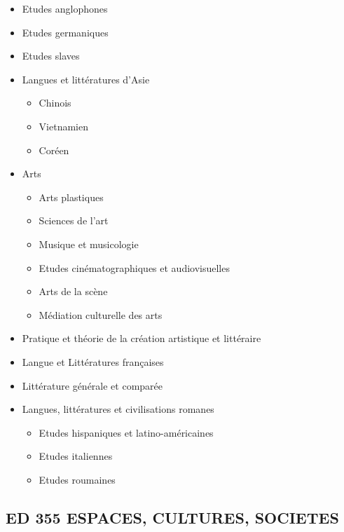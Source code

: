 		\begin{itemize}
		\item Etudes anglophones
		\item Etudes germaniques
		\item Etudes slaves
		\item Langues et littératures d'Asie
			\begin{itemize}
			\item Chinois
			\item Vietnamien
			\item Coréen
			\end{itemize}
        	\item Arts
            		\begin{itemize}
            		\item Arts plastiques 
            		\item Sciences de l’art
            		\item Musique et musicologie
            		\item Etudes cinématographiques et audiovisuelles
            		\item Arts de la scène
            		\item Médiation culturelle des arts
            		\end{itemize}
        	\item Pratique et théorie de la création artistique et littéraire
		\item Langue et Littératures françaises
		\item Littérature générale et comparée
		\item Langues, littératures et civilisations romanes 
			\begin{itemize}
			\item Etudes hispaniques et latino-américaines
			\item Etudes italiennes
			\item Etudes roumaines
			\end{itemize}
		\end{itemize}

	\subsection*{ED 355 ESPACES, CULTURES, SOCIETES}\label{ed-355-espaces-cultures-societes}


